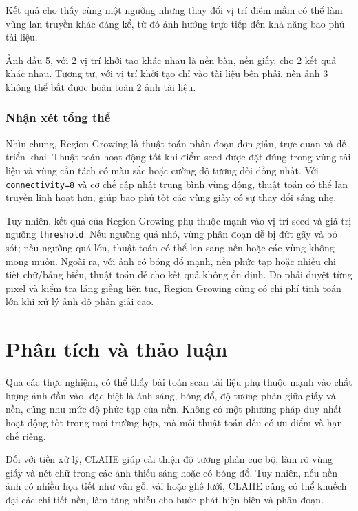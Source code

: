 \documentclass[12pt, a4paper]{report}
\begin{document}
Kết quả cho thấy cùng một ngưỡng nhưng thay đổi vị trí điểm mầm có thể làm vùng lan truyền khác đáng kể, từ đó ảnh hưởng trực tiếp đến khả năng bao phủ tài liệu.

Ảnh đầu 5, với 2 vị trí khởi tạo khác nhau là nền bàn, nền giấy, cho 2 kết quả khác nhau. Tương tự, với vị trí khởi tạo chỉ vào tài liệu bên phải, nên ảnh 3 không thể bắt được hoàn toàn 2 ảnh tài liệu.

\subsubsection{Nhận xét tổng thể}

Nhìn chung, Region Growing là thuật toán phân đoạn đơn giản, trực quan và dễ triển khai. Thuật toán hoạt động tốt khi điểm seed được đặt đúng trong vùng tài liệu và vùng cần tách có màu sắc hoặc cường độ tương đối đồng nhất. Với \texttt{connectivity=8} và cơ chế cập nhật trung bình vùng động, thuật toán có thể lan truyền linh hoạt hơn, giúp bao phủ tốt các vùng giấy có sự thay đổi sáng nhẹ.

Tuy nhiên, kết quả của Region Growing phụ thuộc mạnh vào vị trí seed và giá trị ngưỡng \texttt{threshold}. Nếu ngưỡng quá nhỏ, vùng phân đoạn dễ bị đứt gãy và bỏ sót; nếu ngưỡng quá lớn, thuật toán có thể lan sang nền hoặc các vùng không mong muốn. Ngoài ra, với ảnh có bóng đổ mạnh, nền phức tạp hoặc nhiều chi tiết chữ/bảng biểu, thuật toán dễ cho kết quả không ổn định. Do phải duyệt từng pixel và kiểm tra láng giềng liên tục, Region Growing cũng có chi phí tính toán lớn khi xử lý ảnh độ phân giải cao.

\section{Phân tích và thảo luận}

Qua các thực nghiệm, có thể thấy bài toán scan tài liệu phụ thuộc mạnh vào chất lượng ảnh đầu vào, đặc biệt là ánh sáng, bóng đổ, độ tương phản giữa giấy và nền, cũng như mức độ phức tạp của nền. Không có một phương pháp duy nhất hoạt động tốt trong mọi trường hợp, mà mỗi thuật toán đều có ưu điểm và hạn chế riêng.

Đối với tiền xử lý, CLAHE giúp cải thiện độ tương phản cục bộ, làm rõ vùng giấy và nét chữ trong các ảnh thiếu sáng hoặc có bóng đổ. Tuy nhiên, nếu nền ảnh có nhiều họa tiết như vân gỗ, vải hoặc ghế lưới, CLAHE cũng có thể khuếch đại các chi tiết nền, làm tăng nhiễu cho bước phát hiện biên và phân đoạn.
\end{document}
